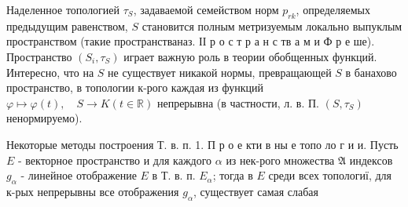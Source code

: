 \documentclass[10pt]{article}
\begin{document}
Наделенное топологией $\tau_{S}$, задаваемой семейством норм $p_{r k}$, определяемых предыдущим равенством, $S$ становится полным метризуемым локально выпуклым пространством (такие пространстваназ. ІІ р о с т р а н с тв а м и Ф р е ше). Пространство $\left(S_{i}, \tau_{S}\right)$ играет важную роль в теории обобщенных функций. Интересно, что на $S$ не существует никакой нормы, превращающей $S$ в банахово пространство, в топологии к-рого каждая из функций $\varphi \mapsto \varphi(t), \quad S \rightarrow K(t \in \mathbb{R})$ непрерывна (в частности, л. в. П. $\left(S, \tau_{S}\right)$ ненормируемо).



Некоторые методы построения Т. в. п. 1. П р о е кти в ны е топо ло г и и. Пусть $E$ - векторное пространство и для каждого $\alpha$ из нек-рого множества $\mathfrak{A}$ индексов $g_{\alpha}$ - линейное отображение $E$ в Т. в. п. $E_{\alpha}$; тогда в $E$ среди всех топологиї, для к-рых непрерывны все отображения $g_{\alpha}$, существует самая слабая
\end{document}
